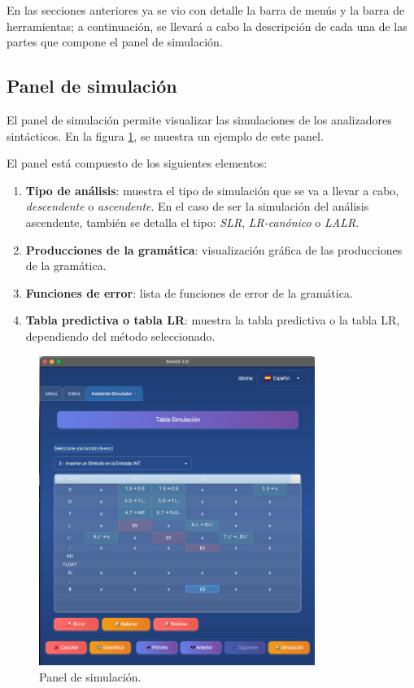   En las secciones anteriores ya se vio con detalle la barra de menús y la barra de herramientas; a continuación, se llevará a cabo la descripción de cada una de las partes que compone el panel de simulación.



\subsection{Panel de simulación}

El panel de simulación permite visualizar las simulaciones de los analizadores sintácticos. En la figura \ref{fig:d6}, se muestra un ejemplo de este panel.

El panel está compuesto de los siguientes elementos:
\begin{enumerate}
 \item \textbf{Tipo de análisis}: muestra el tipo de simulación que se va a llevar a cabo, \textit{descendente} o \textit{ascendente}. En el caso de ser la simulación del análisis ascendente, también se detalla el tipo: \textit{SLR}, \textit{LR-canónico} o \textit{LALR}.
 \item \textbf{Producciones de la gramática}: visualización gráfica de las producciones de la gramática.
 \item \textbf{Funciones de error}: lista de funciones de error de la gramática.
 \item \textbf{Tabla predictiva o tabla LR}: muestra la tabla predictiva o la tabla LR, dependiendo del método seleccionado.
\end{enumerate}

\begin{figure}[htp]
\centering
	\includegraphics[width=0.8\textwidth]{figuras2/simulador/paso5_tablaPredictivaCompleta.png}
	\caption{Panel de simulación.}
	\label{fig:d6}
\end{figure}

